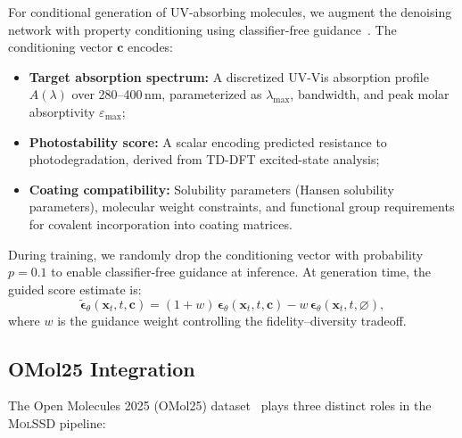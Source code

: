 \documentclass[11pt,a4paper]{article}
\newcommand{\molssd}{\textsc{MolSSD}}
\newcommand{\xt}{\mathbf{x}_t}
\begin{document}
For conditional generation of UV-absorbing molecules, we augment the denoising
network with property conditioning using classifier-free
guidance~\citep{ho2022classifierfree}. The conditioning vector $\mathbf{c}$ encodes:
\begin{itemize}[leftmargin=*]
  \item \textbf{Target absorption spectrum:} A discretized UV-Vis absorption profile
    $A(\lambda)$ over 280--400\,nm, parameterized as $\lambda_\text{max}$, bandwidth,
    and peak molar absorptivity $\varepsilon_\text{max}$;
  \item \textbf{Photostability score:} A scalar encoding predicted resistance to
    photodegradation, derived from TD-DFT excited-state analysis;
  \item \textbf{Coating compatibility:} Solubility parameters (Hansen solubility
    parameters), molecular weight constraints, and functional group requirements for
    covalent incorporation into coating matrices.
\end{itemize}

During training, we randomly drop the conditioning vector with probability $p = 0.1$
to enable classifier-free guidance at inference. At generation time, the guided score
estimate is:
\begin{equation}\label{eq:cfg}
  \tilde{\boldsymbol{\epsilon}}_\theta(\xt, t, \mathbf{c})
  = (1 + w)\,\boldsymbol{\epsilon}_\theta(\xt, t, \mathbf{c})
  - w\,\boldsymbol{\epsilon}_\theta(\xt, t, \varnothing),
\end{equation}
where $w$ is the guidance weight controlling the fidelity--diversity tradeoff.

\subsection{OMol25 Integration}

The Open Molecules 2025 (OMol25) dataset~\citep{omol25} plays three distinct roles in
the \molssd{} pipeline:
\end{document}
